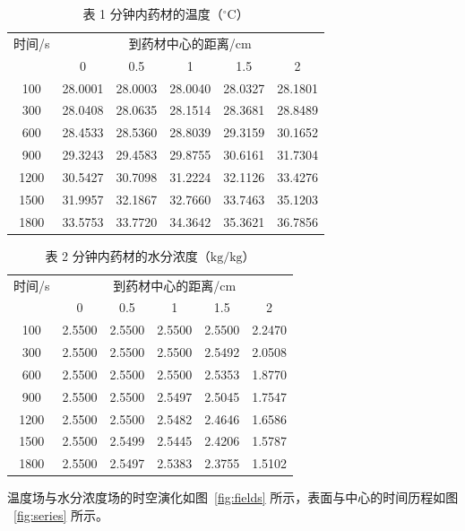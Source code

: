 \begin{table}[H]
  \centering
  \caption{表 1 分钟内药材的温度（$^{\circ}\mathrm{C}$）}
  \label{tab:T1}
  \begin{tabular}{cccccc}
    \hline
    时间/s & \multicolumn{5}{c}{到药材中心的距离/cm} \\
    & 0 & 0.5 & 1 & 1.5 & 2 \\
    \hline
    100   & 28.0001 & 28.0003 & 28.0040 & 28.0327 & 28.1801 \\
    300   & 28.0408 & 28.0635 & 28.1514 & 28.3681 & 28.8489 \\
    600   & 28.4533 & 28.5360 & 28.8039 & 29.3159 & 30.1652 \\
    900   & 29.3243 & 29.4583 & 29.8755 & 30.6161 & 31.7304 \\
    1200  & 30.5427 & 30.7098 & 31.2224 & 32.1126 & 33.4276 \\
    1500  & 31.9957 & 32.1867 & 32.7660 & 33.7463 & 35.1203 \\
    1800  & 33.5753 & 33.7720 & 34.3642 & 35.3621 & 36.7856 \\
    \hline
  \end{tabular}
\end{table}

\begin{table}[H]
  \centering
  \caption{表 2 分钟内药材的水分浓度（$\mathrm{kg/kg}$）}
  \label{tab:C1}
  \begin{tabular}{cccccc}
    \hline
    时间/s & \multicolumn{5}{c}{到药材中心的距离/cm} \\
    & 0 & 0.5 & 1 & 1.5 & 2 \\
    \hline
    100   & 2.5500 & 2.5500 & 2.5500 & 2.5500 & 2.2470 \\
    300   & 2.5500 & 2.5500 & 2.5500 & 2.5492 & 2.0508 \\
    600   & 2.5500 & 2.5500 & 2.5500 & 2.5353 & 1.8770 \\
    900   & 2.5500 & 2.5500 & 2.5497 & 2.5045 & 1.7547 \\
    1200  & 2.5500 & 2.5500 & 2.5482 & 2.4646 & 1.6586 \\
    1500  & 2.5500 & 2.5499 & 2.5445 & 2.4206 & 1.5787 \\
    1800  & 2.5500 & 2.5497 & 2.5383 & 2.3755 & 1.5102 \\
    \hline
  \end{tabular}
\end{table}

温度场与水分浓度场的时空演化如图~\ref{fig:fields} 所示，表面与中心的时间历程如图
~\ref{fig:series} 所示。

